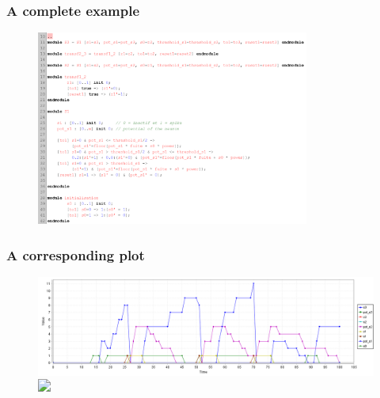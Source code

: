 \begin{frame}
  \frametitle{A complete example}

  \begin{figure}
    \includegraphics[width=0.8\textwidth]{pic/simple_serie_complex.png}
  \end{figure}

\end{frame}

\begin{frame}
  \frametitle{A corresponding plot}

  \begin{figure}
    \includegraphics[width=\textwidth]{pic/simple_serie_complex_plot.png}

    \includegraphics<2>[width=\textwidth]{pic/simple_serie_complex_explorat.png}
  \end{figure}

\end{frame}